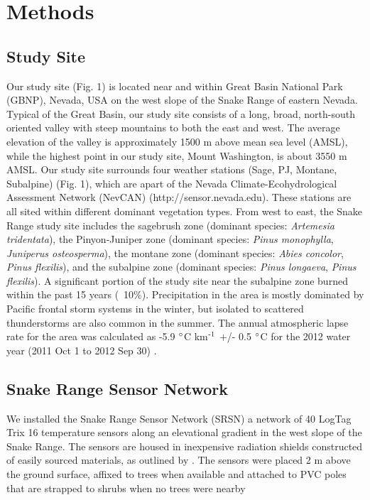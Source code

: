 \documentclass{ametsoc}
\begin{document}
\section{Methods}
\subsection{Study Site} 
Our study site (Fig. 1) is located near and within Great Basin National Park (GBNP),
Nevada, USA on the west slope of the Snake Range of eastern Nevada.  Typical of the 
Great Basin, our study site consists of a long, broad, north-south oriented valley with steep 
mountains to both the east and west.  The average elevation of the valley is approximately
1500 m above mean sea level (AMSL), while the highest point in our study site, Mount Washington,
is about 3550 m AMSL.  Our study site surrounds four weather stations  (Sage, PJ, Montane, Subalpine)
(Fig. 1), which are apart of the Nevada Climate-Ecohydrological Assessment Network (NevCAN) 
(http://sensor.nevada.edu).  These stations are all sited within different dominant vegetation
types.  From west to east, the Snake Range study site includes the sagebrush zone (dominant
species: \textit{Artemesia tridentata}), the Pinyon-Juniper zone (dominant species: \textit{Pinus monophylla},
\textit{Juniperus osteosperma}), the montane zone (dominant species: \textit{Abies concolor}, 
\textit{Pinus flexilis}), and the subalpine zone (dominant species: \textit{Pinus longaeva}, 
\textit{Pinus flexilis}).  A significant portion of the study site near the subalpine zone burned within
the past 15 years (~10\%).  Precipitation in the area is mostly dominated by Pacific frontal storm
systems in the winter, but isolated to scattered thunderstorms are also common in the summer.  The annual 
atmospheric lapse rate for the area was calculated as -5.9 $\degree$C km$\textsuperscript{-1}$ +/- 
0.5 $\degree$C for the 2012 water year (2011 Oct 1 to 2012 Sep 30) \citep{Mensing2013}.

\subsection{Snake Range Sensor Network}  We installed the Snake Range Sensor
Network (SRSN) a network of 40 LogTag Trix 16 temperature sensors along an
elevational gradient in the west slope of the Snake Range.  The sensors are
housed in inexpensive radiation shields constructed of easily sourced materials,
as outlined by \citet{Holden2013}.  The sensors were placed 2 m above the ground
surface, affixed to trees when available and attached to PVC poles that are
strapped to shrubs when no trees were nearby
\end{document}
